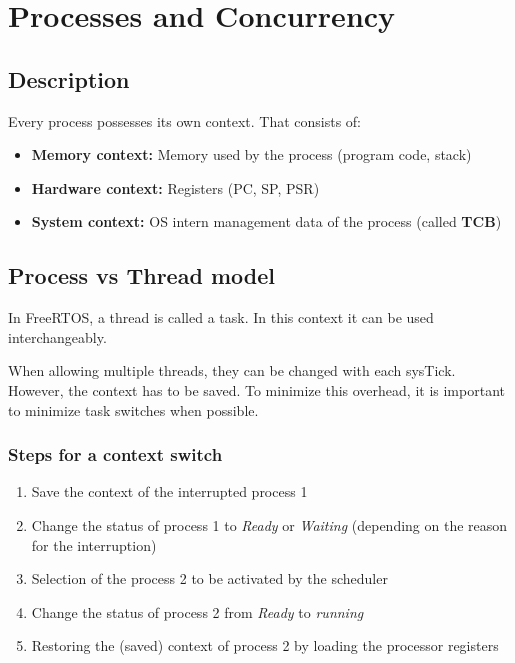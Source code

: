 \section{Processes and Concurrency}

\subsection{Description}

Every process possesses its own context.
That consists of:
\begin{itemize}
    \item \textbf{Memory context:} Memory used by the process (program code, stack)
    \item \textbf{Hardware context:} Registers (PC, SP, PSR)
    \item \textbf{System context:} OS intern management data of the process (called \textbf{TCB})
\end{itemize}


\subsection{Process vs Thread model}

In FreeRTOS, a thread is called a task.
In this context it can be used interchangeably.

When allowing multiple threads, they can be changed with each sysTick.
However, the context has to be saved.
To minimize this overhead, it is important to minimize task switches when possible.

\subsubsection{Steps for a context switch}

\begin{enumerate}
    \item Save the context of the interrupted process 1
    \item Change the status of process 1 to \emph{Ready} or \emph{Waiting} (depending on the reason for the interruption)
    \item Selection of the process 2 to be activated by the scheduler
    \item Change the status of process 2 from \emph{Ready} to \emph{running}
    \item Restoring the (saved) context of process 2 by loading the processor registers
\end{enumerate}

